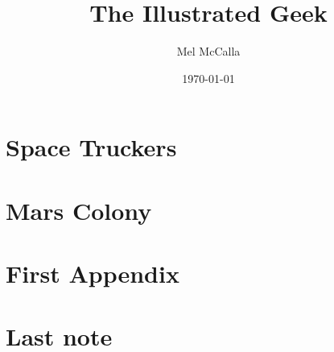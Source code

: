 \documentclass{book}
\title{\bf The Illustrated Geek}
\author{Mel McCalla}
\date{\today}
\begin{document}
\frontmatter
\maketitle
\tableofcontents

\mainmatter
\chapter{Space Truckers}

\chapter{Mars Colony}


\appendix
\chapter{First Appendix}

\backmatter
\chapter{Last note}
\end{document}
